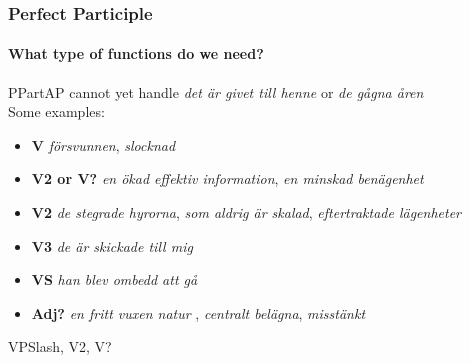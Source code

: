 \documentclass[10pt]{beamer}
\renewcommand{\baselinestretch}{1.5}
\begin{document}
\begin{frame}
 \renewcommand{\baselinestretch}{1.0}
\frametitle{Perfect Participle}
\framesubtitle{What type of functions do we need?} 
PPartAP cannot yet handle \emph{det är givet till henne} or \emph{de gågna åren} \\
\pause
Some examples:
\begin{itemize}
\item{ \textbf{V} \small{\emph{försvunnen}}, \small{\emph{slocknad}}}
\pause
\item{\textbf{V2 or V?} \small{\emph{en ökad effektiv information}},
\small{\emph{en minskad benägenhet}}} \\
\pause
\item{\textbf{V2}
\small{\emph{de stegrade hyrorna}},
\small{\emph{som aldrig är skalad}}, %
\small{\emph{eftertraktade lägenheter}}} \\
\pause
\item{\textbf{V3} \small{\emph{de är skickade till mig}}}
\pause
\item{\textbf{VS} \small{\emph{han blev ombedd att gå}}}
\pause
\item{\textbf{Adj?}
\small{\emph{en fritt vuxen natur }},
\small{\emph{centralt belägna}},
\small{\emph{misstänkt }}}%
\end{itemize}
\pause

VPSlash, V2, V?\\
\end{frame}
\end{document}
